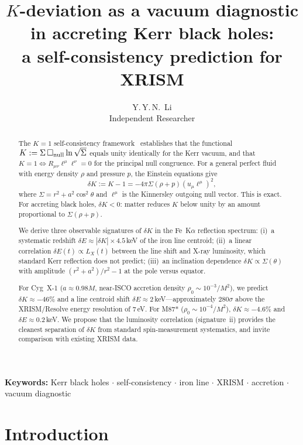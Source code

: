 \documentclass[12pt,a4paper]{article}
\title{\textbf{$K$-deviation as a vacuum diagnostic\\
in accreting Kerr black holes:\\
a self-consistency prediction for XRISM}}
\author{Y.\,Y.\,N.\ Li\\
\small Independent Researcher}
\date{}
\begin{document}
\maketitle

\begin{abstract}
The $K=1$ self-consistency framework~\cite{K1note} establishes
that the functional $K:=\Sigma\,\Box_{\rm null}\ln\sqrt\Sigma$
equals unity identically for the Kerr vacuum, and that
$K=1\Leftrightarrow R_{\mu\nu}\ell^\mu\ell^\nu=0$ for the
principal null congruence.
For a general perfect fluid with energy density $\rho$ and
pressure $p$, the Einstein equations give
\begin{equation}\label{eq:deltaK}
  \delta K := K - 1 = -4\pi\Sigma(\rho+p)(u_\mu\ell^\mu)^2,
\end{equation}
where $\Sigma=r^2+a^2\cos^2\!\theta$ and $\ell^\mu$ is the
Kinnersley outgoing null vector.
This is exact.
For accreting black holes, $\delta K<0$: matter reduces $K$
below unity by an amount proportional to $\Sigma(\rho+p)$.

We derive three observable signatures of $\delta K$ in the
Fe~K$\alpha$ reflection spectrum:
(i)~a systematic redshift $\delta E\approx|\delta K|\times 4.5$\,keV
of the iron line centroid;
(ii)~a linear correlation $\delta E(t)\propto L_X(t)$ between
the line shift and X-ray luminosity, which standard Kerr
reflection does not predict;
(iii)~an inclination dependence $\delta K\propto\Sigma(\theta)$
with amplitude $(r^2+a^2)/r^2-1$ at the pole versus equator.

For Cyg~X-1 ($a\approx0.98M$, near-ISCO accretion density
$\rho_0\sim10^{-3}/M^2$), we predict
$\delta K\approx-46\%$ and a line centroid shift
$\delta E\approx 2$\,keV---approximately $280\sigma$ above
the XRISM/Resolve energy resolution of 7\,eV.
For M87* ($\rho_0\sim10^{-4}/M^2$),
$\delta K\approx-4.6\%$ and $\delta E\approx 0.2$\,keV.
We propose that the luminosity correlation (signature~ii)
provides the cleanest separation of $\delta K$ from standard
spin-measurement systematics, and invite comparison with
existing XRISM data.
\end{abstract}

\medskip
\noindent\textbf{Keywords:} Kerr black holes $\cdot$
self-consistency $\cdot$ iron line $\cdot$ XRISM $\cdot$
accretion $\cdot$ vacuum diagnostic

\section{Introduction}\label{sec:intro}
\end{document}
